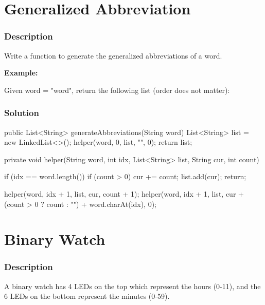 \newpage

\section{Generalized Abbreviation} %

\subsubsection{Description}
Write a function to generate the generalized abbreviations of a word.

\textbf{Example:}

Given word = "word", return the following list (order does not matter):


\subsubsection{Solution}

\begin{Code}
public List<String> generateAbbreviations(String word) {
    List<String> list = new LinkedList<>();
    helper(word, 0, list, "", 0);
    return list;
}

private void helper(String word, int idx, List<String> list, String cur, int count) {
    if (idx == word.length()) {
        if (count > 0) {
            cur += count;
        }
        list.add(cur);
        return;
    }

    helper(word, idx + 1, list, cur, count + 1);
    helper(word, idx + 1, list, cur + (count > 0 ? count : "") + word.charAt(idx), 0);
}
\end{Code}

\newpage

\section{Binary Watch} %

\subsubsection{Description}

A binary watch has 4 LEDs on the top which represent the hours (0-11), and the 6 LEDs on the bottom represent the minutes (0-59).

